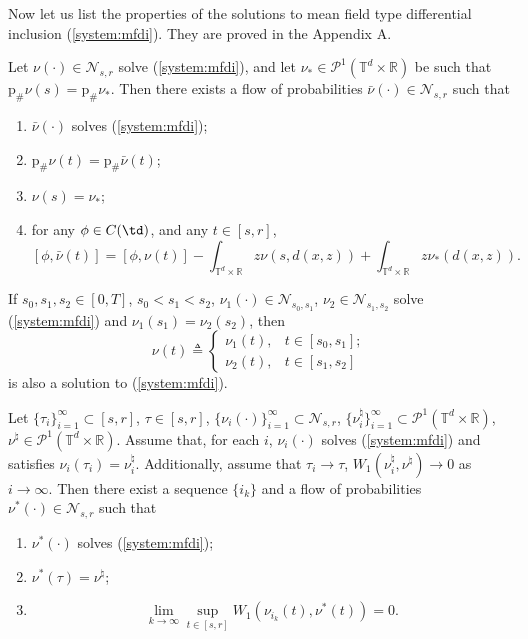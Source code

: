 \documentclass[a4paper,12pt]{article}
\newcommand{\tdr}{\mathbb{T}^{d}\times\mathbb{R}}
\begin{document}
Now let us list the properties of the solutions to mean field type differential inclusion (\ref{system:mfdi}). They are proved in the Appendix A.
\begin{proposition}\label{prop:shift}
	Let $\nu(\cdot)\in \mathcal{N}_{s,r}$ solve (\ref{system:mfdi}), and let $\nu_*\in\mathcal{P}^1(\tdr)$ be such that $\mathrm{p}_\#\nu(s)=\mathrm{p}_\#\nu_*$.  Then there exists a flow of probabilities $\bar{\nu}(\cdot)\in \mathcal{N}_{s,r}$ such that
	\begin{enumerate}
		\item $\bar{\nu}(\cdot)$ solves (\ref{system:mfdi});
		\item $\mathrm{p}_\#\nu(t)=\mathrm{p}_\#\bar{\nu}(t)$;
		\item $\nu(s)=\nu_*$;
		\item for any $\phi\in C(\td)$, and any $t\in [s,r]$, 
		$$[\phi,\bar{\nu}(t)]=[\phi,\nu(t)]-\int_{\tdr}z\nu(s,d(x,z))+\int_{\tdr}z\nu_*(d(x,z)). $$
	\end{enumerate} 
\end{proposition}

\begin{proposition}\label{prop:concatination}
	If $s_0,s_1,s_2\in [0,T]$, $s_0<s_1<s_2$, $\nu_1(\cdot)\in \mathcal{N}_{s_0,s_1}$, $\nu_2\in\mathcal{N}_{s_1,s_2}$ solve (\ref{system:mfdi}) and $\nu_1(s_1)=\nu_2(s_2)$, then
	$$\nu(t)\triangleq \left\{\begin{array}{cc}
	\nu_1(t), & t\in [s_0,s_1];\\
	\nu_2(t), & t\in [s_1,s_2]
	\end{array}\right. $$ is also a solution to (\ref{system:mfdi}).
\end{proposition}

\begin{proposition}\label{prop:limit} Let $\{\tau_i\}_{i=1}^\infty\subset [s,r]$, $\tau\in [s,r]$, $\{\nu_i(\cdot)\}_{i=1}^\infty\subset \mathcal{N}_{s,r}$, $\{\nu^\natural_i\}_{i=1}^\infty\subset \mathcal{P}^1(\tdr)$, $\nu^\natural\in\mathcal{P}^1(\tdr)$. Assume that, for each $i$, $\nu_i(\cdot)$ solves (\ref{system:mfdi}) and satisfies $\nu_i(\tau_i)=\nu_i^\natural$. Additionally, assume that $\tau_i\rightarrow\tau$, $W_1(\nu_i^\natural,\nu^\natural)\rightarrow 0$ as $i\rightarrow\infty$. Then there exist a sequence $\{i_k\}$ and a flow of probabilities $\nu^*(\cdot)\in\mathcal{N}_{s,r}$ such that
	\begin{enumerate}
		\item $\nu^*(\cdot)$ solves (\ref{system:mfdi});
		\item $\nu^*(\tau)=\nu^\natural$;
		\item $$\lim_{k\rightarrow \infty}\sup_{t\in [s,r]}W_1(\nu_{i_k}(t),\nu^*(t))=0. $$
	\end{enumerate}
	
\end{proposition}
\end{document}
